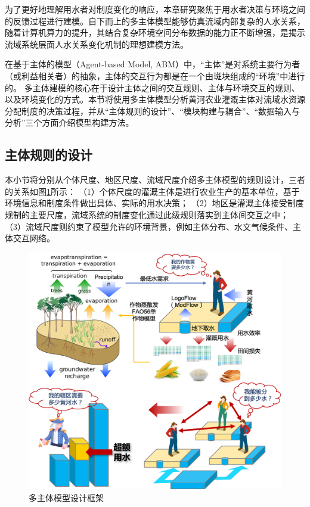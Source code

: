 为了更好地理解用水者对制度变化的响应，本章研究聚焦于用水者决策与环境之间的反馈过程进行建模。自下而上的多主体模型能够仿真流域内部复杂的人水关系，随着计算机算力的提升，其结合复杂环境空间分布数据的能力正不断增强，是揭示流域系统层面人水关系变化机制的理想建模方法。

在基于主体的模型（Agent-based Model, ABM）中，“主体”是对系统主要行为者（或利益相关者）的抽象，主体的交互行为都是在一个由斑块组成的“环境”中进行的。
多主体建模的核心在于设计主体之间的交互规则、主体与环境交互的规则、以及环境变化的方式。本节将使用多主体模型分析黄河农业灌溉主体对流域水资源分配制度的决策过程，并从“主体规则的设计”、“模块构建与耦合”、“数据输入与分析”三个方面介绍模型构建方法。

\subsection{主体规则的设计}

本小节将分别从个体尺度、地区尺度、流域尺度介绍多主体模型的规则设计，三者的关系如图\ref{ch6:fig:framework}所示：
（1）个体尺度的灌溉主体是进行农业生产的基本单位，基于环境信息和制度条件做出具体、实际的用水决策；
（2）地区是灌溉主体接受制度规制的主要尺度，流域系统的制度变化通过此级规则落实到主体间交互之中；
（3）流域尺度则约束了模型允许的环境背景，例如主体分布、水文气候条件、主体交互网络。

\begin{figure}[htb]
    \centering
    \includegraphics[width=\textwidth]{img/ch6/ch6_framework.png}
    \caption{多主体模型设计框架}\label{ch6:fig:framework}
\end{figure}

